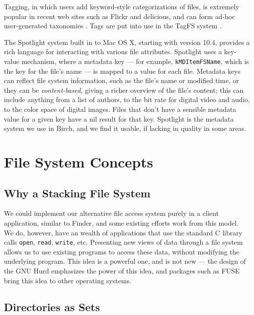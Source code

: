 \documentclass{article}
\begin{document}
Tagging, in which users add keyword-style categorizations of files, is
extremely popular in recent web sites such as Flickr and delicious,
and can form ad-hoc user-generated taxonomies \cite{Mathes:2004}. Tags
are put into use in the TagFS system \cite{Bloehdorn:2006}.

The Spotlight system built in to Mac OS X, starting with version 10.4,
provides a rich language for interacting with various file
attributes. Spotlight uses a key-value mechanism, where a metadata key
--- for example, \texttt{kMDItemFSName}, which is the key for the
file's name --- is mapped to a value for each file. Metadata keys can
reflect file system information, such as the file's name or modified
time, or they can be \textit{content-based,} giving a richer overview
of the file's content; this can include anything from a list of
authors, to the bit rate for digital video and audio, to the color
space of digital images. Files that don't have a sensible metadata
value for a given key have a nil result for that key. Spotlight is the
metadata system we use in Birch, and we find it usable, if lacking in
quality in some areas.

\section{File System Concepts}

\subsection{Why a Stacking File System}

We could implement our alternative file access system purely in a
client application, similar to Finder, and some existing efforts
\cite{Gorter:2004,Nickell:2006} work from this model. We do, however,
have an wealth of applications that use the standard C library calls
\texttt{open}, \texttt{read}, \texttt{write}, etc. Presenting new
views of data through a file system allows us to use existing programs
to access these data, without modifying the underlying program. This
idea is a powerful one, and is not new --- the design of the GNU Hurd
\cite{Bushnell:1994} emphasizes the power of this idea, and packages
such as FUSE \cite{Szeredi:2006} bring this idea to other operating
systems.

\subsection{Directories as Sets}
\end{document}
